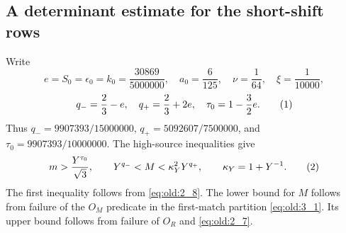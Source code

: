 \subsection*{A determinant estimate for the short-shift rows}

Write
\[
 e=S_0=\epsilon_0=k_0=\frac{30869}{5000000},\quad
 a_0=\frac6{125},\quad \nu=\frac1{64},\quad \xi=\frac1{10000},
\]
\[
 q_-=\frac23-e,\quad q_+=\frac23+2e,\quad
 \tau_0=1-\frac32e .
\AutoTag{eq:old:5_10}
\]
Thus \(q_-=9907393/15000000\), \(q_+=5092607/7500000\), and
\(\tau_0=9907393/10000000\). The high-source inequalities give
\[
 m>\frac{Y^{\tau_0}}{\sqrt3},\qquad
 Y^{q_-}<M<\kappa_Y^2Y^{q_+},\qquad \kappa_Y=1+Y^{-1}.
\AutoTag{eq:old:5_11}
\]
The first inequality follows from \eqref{eq:old:2_8}. The lower bound for \(M\) follows
from failure of the \(O_M\) predicate in the first-match partition
\eqref{eq:old:3_1}. Its upper bound follows from failure of \(O_R\) and
\eqref{eq:old:2_7}.

